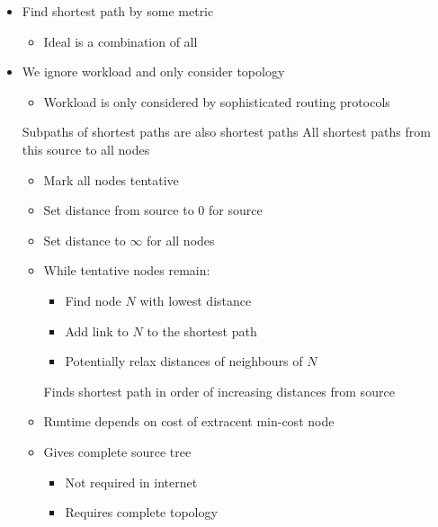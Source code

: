 \begin{itemize}
    \item Find shortest path by some metric
        \begin{itemize}
             Avoid circuitous paths
             Avoid small pipes
             Avoid expensive links
             To reduce switching
            \item Ideal is a combination of all
        \end{itemize}
    \item We ignore workload and only consider topology
        \begin{itemize}
            \item Workload is only considered by sophisticated routing protocols
        \end{itemize}
     Subpaths of shortest paths are also shortest paths
     All shortest paths from this source to all nodes
        \begin{itemize}
            \item Mark all nodes tentative
            \item Set distance from source to $0$ for source
            \item Set distance to $\infty$ for all nodes
            \item While tentative nodes remain:
                \begin{itemize}
                    \item Find node $N$ with lowest distance
                    \item Add link to $N$ to the shortest path
                    \item Potentially relax distances of neighbours of $N$
                \end{itemize}
            \ipro Finds shortest path in order of increasing distances from source
            \item Runtime depends on cost of extracent min-cost node
            \item Gives complete source tree
                \begin{itemize}
                    \item Not required in internet
                    \item Requires complete topology
                \end{itemize}
        \end{itemize}
\end{itemize}
